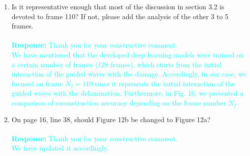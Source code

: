 \documentclass[11pt,a2paper]{report}
\begin{document}
\begin{enumerate}
{		}
		\item Is it representative enough that most of the discussion in section 3.2 is devoted to frame 110? If not, please add the analysis of the other 3 to 5 frames.
		\\ \\ 
		\textcolor{Cyan}
		{
			\textbf{Response:}
			Thank you for your constructive comment. \\
			We have mentioned that the developed deep learning models were trained on a certain number of frames (128 frames), which starts from the initial interaction of the guided waves with the damage.
			Accordingly, in our case, we focused on frame $N_f =110$ since it represents the initial interaction of the guided waves with the delamination.
			Furthermore, in Fig. 16, we presented a comparison of reconstruction accuracy depending on the frame number $N_f$.
		}
		\item On page 16, line 38, should Figure 12b be changed to Figure 12a?
		\\ \\ 
		\textcolor{Cyan}
		{
			\textbf{Response:}
			Thank you for your constructive comment. 
			\\
			We have updated it accordingly.
		}
	\end{enumerate}
\end{document}

